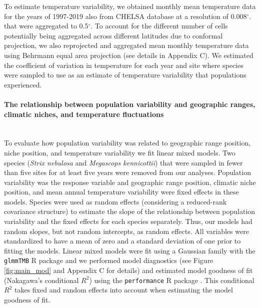 To estimate temperature variability, we obtained monthly mean temperature data for the years of 1997-2019 also from CHELSA database at a resolution of 0.008$^\circ$. that were aggregated to 0.5$^\circ$. To account for the different number of cells potentially being aggregated across different latitudes due to conformal projection, we also reprojected and aggregated mean monthly temperature data using Behrmann equal area projection (see details in Appendix C). We estimated the coefficient of variation in temperature for each year and site where species were sampled to use as an estimate of temperature variability that populations experienced. 
\paragraph*{The relationship between population variability and geographic ranges, climatic niches, and temperature fluctuations}\mbox{}\\ 
To evaluate how population variability was related to geographic range position, niche position, and temperature variability we fit linear mixed models. Two species (\textit{Strix nebulosa} and \textit{Megascops kennicottii}) that were sampled in fewer than five sites for at least five years were removed from our analyses. Population variability was the response variable and geographic range position, climatic niche position, and mean annual temperature variability were fixed effects in these models. Species were used as random effects (considering a reduced-rank covariance structure) to estimate the slope of the relationship between population variability and the fixed effects for each species separately. Thus, our models had random slopes, but not random intercepts, as random effects. All variables were standardized to have a mean of zero and a standard deviation of one prior to fitting the models. Linear mixed models were fit using a Gaussian family with the \texttt{glmmTMB} R package \parencite{brooks2017} and we performed model diagnostics (see Figure \ref{fig:main_mod} and Appendix C for details) and estimated model goodness of fit (Nakagawa's conditional $R^2$) using the \texttt{performance} R package \parencite{ludecke2021}. This conditional $R^2$ takes fixed and random effects into account when estimating the model goodness of fit.
